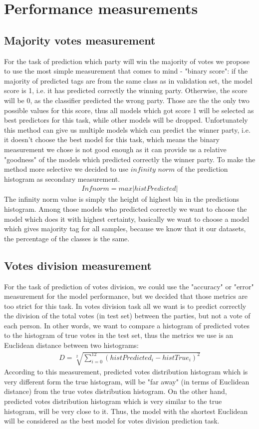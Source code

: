\documentclass[12pt]{article}
\begin{document}
\newpage
\section{Performance measurements}
\subsection{Majority votes measurement}
For the task of prediction which party will win the majority of votes we propose to use the most simple measurement that comes to mind - "binary score": if the majority of predicted tags are from the same class as in validation set, the model score is 1, i.e. it has predicted correctly the winning party. Otherwise, the score will be 0, as the classifier predicted the wrong party. Those are the the only two possible values for this score, thus all models which got score 1 will be selected as best predictors for this task, while other models will be dropped. Unfortunately this method can give us multiple models which can predict the winner party, i.e. it doesn't choose the best model for this task, which means the binary measurement we chose is not good enough as it can provide us a relative "goodness" of the models which predicted correctly the winner party. To make the method more selective we decided to use $infinity$ $norm$ of the prediction histogram as secondary measurement. 
\begin{gather*}
Inf norm = max | histPredicted |   
\end{gather*}
The infinity norm value is simply the height of highest bin in the predictions histogram. Among those models who predicted correctly we want to choose the model which does it with highest certainty, basically we want to choose a model which gives majority tag for all samples, because we know that it our datasets, the percentage of the classes is the same.
     
\subsection{Votes division measurement}
For the task of prediction of votes division, we could use the "accuracy" or "error" measurement for the model performance, but we decided that those metrics are too strict for this task. In votes division task all we want is to predict correctly the division of the total votes (in test set) between the parties, but not a vote of each person. In other words, we want to compare a histogram of predicted votes to the histogram of true votes in the test set, thus the metrics we use is an Euclidean distance between two histograms:
\begin{gather*}
D = \sqrt[2]{\sum_{i=0}^{12} (histPredicted_i - histTrue_i)^2}   
\end{gather*}
According to this measurement, predicted votes distribution histogram which is very different form the true histogram, will be "far away" (in terms of Euclidean distance) from the true votes distribution histogram. On the other hand, predicted votes distribution histogram which is very similar to the true histogram, will be very close to it. Thus, the model with the shortest Euclidean will be considered as the best model for votes division prediction task.  
\end{document}
